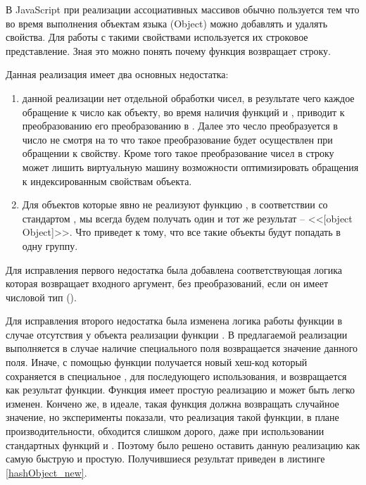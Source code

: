 В JavaScript при реализации ассоциативных массивов обычно пользуется тем что во время выполнения объектам языка (Object) можно добавлять и удалять свойства. Для работы с такими свойствами используется их строковое представление.\cite{EffJS} Зная это можно понять почему функция  возвращает строку.

Данная реализация имеет два основных недостатка:
\begin{enumerate}
\item данной реализации нет отдельной обработки чисел, в результате чего каждое обращение к число как объекту, во время наличия функций 	 и , приводит к преобразованию его преобразованию в . Далее это чесло преобразуется в число не смотря на то что такое преобразование будет осуществлен при обращении к свойству.
Кроме того такое преобразование чисел в строку может лишить виртуальную машину возможности оптимизировать обращения к индексированным свойствам объекта.

\item Для объектов которые явно не реализуют функцию , в соответствии со стандартом \cite{ES5}, мы всегда будем получать один и тот же результат -- <<[object Object]>>. Что приведет к тому, что все такие объекты будут попадать в одну группу.
\end{enumerate}

Для исправления первого недостатка была добавлена соответствующая логика которая возвращает входного аргумент, без преобразований, если он имеет числовой тип ().

Для исправления второго недостатка была изменена логика работы функции в случае отсутствия у объекта реализации функции . В предлагаемой реализации выполняется в случае наличие специального поля  возвращается значение данного поля. Иначе, с помощью функции  получается новый хеш-код который сохраняется в специальное , для последующего использования, и возвращается как результат функции.
Функция  имеет простую реализацию и может быть легко изменен. Кончено же, в идеале, такая функция должна возвращать случайное значение, но эксперименты показали, что реализация такой функции, в плане производительности, обходится слишком дорого, даже при использовании стандартных функций  и . Поэтому было решено оставить данную реализацию как самую быструю и простую.
Получившиеся результат приведен в листинге \ref{hashObject_new}.

